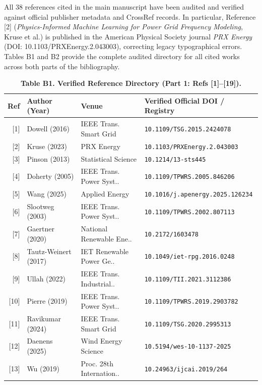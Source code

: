 \documentclass[
  journal]{IEEEtran}
\begin{document}
All 38 references cited in the main manuscript have been audited and
verified against official publisher metadata and CrossRef records. In
particular, Reference {[}2{]} (\emph{Physics-Informed Machine Learning
for Power Grid Frequency Modeling}, Kruse et al.) is published in the
American Physical Society journal \emph{PRX Energy} (DOI:
10.1103/PRXEnergy.2.043003), correcting legacy typographical errors.
Tables B1 and B2 provide the complete audited directory for all cited
works across both parts of the bibliography.

\begin{table}[!t]
\centering
\fontsize{8.0pt}{9.6pt}\selectfont
\setlength{\tabcolsep}{4pt}
\renewcommand{\arraystretch}{1.05}
\caption*{\textbf{Table B1. Verified Reference Directory (Part 1: Refs [1]--[19]).}}
%
\setlength{\tabcolsep}{4pt}
\begin{tabular}{rlll}
\toprule
\textbf{Ref} & \textbf{Author (Year)} & \textbf{Venue} & \textbf{Verified Official DOI / Registry} \\
\midrule
{[1]} & Dowell (2016) & IEEE Trans. Smart Grid & \texttt{10.1109/TSG.2015.2424078} \\
{[2]} & Kruse (2023) & PRX Energy & \texttt{10.1103/PRXEnergy.2.043003} \\
{[3]} & Pinson (2013) & Statistical Science & \texttt{10.1214/13-sts445} \\
{[4]} & Doherty (2005) & IEEE Trans. Power Syst.. & \texttt{10.1109/TPWRS.2005.846206} \\
{[5]} & Wang (2025) & Applied Energy & \texttt{10.1016/j.apenergy.2025.126234} \\
{[6]} & Slootweg (2003) & IEEE Trans. Power Syst.. & \texttt{10.1109/TPWRS.2002.807113} \\
{[7]} & Gaertner (2020) & National Renewable Ene.. & \texttt{10.2172/1603478} \\
{[8]} & Tautz-Weinert (2017) & IET Renewable Power Ge.. & \texttt{10.1049/iet-rpg.2016.0248} \\
{[9]} & Ullah (2022) & IEEE Trans. Industrial.. & \texttt{10.1109/TII.2021.3112386} \\
{[10]} & Pierre (2019) & IEEE Trans. Power Syst.. & \texttt{10.1109/TPWRS.2019.2903782} \\
{[11]} & Ravikumar (2024) & IEEE Trans. Smart Grid & \texttt{10.1109/TSG.2020.2995313} \\
{[12]} & Daenens (2025) & Wind Energy Science & \texttt{10.5194/wes-10-1137-2025} \\
{[13]} & Wu (2019) & Proc. 28th Internation.. & \texttt{10.24963/ijcai.2019/264} \\

\end{tabular}
\end{table}
\end{document}
